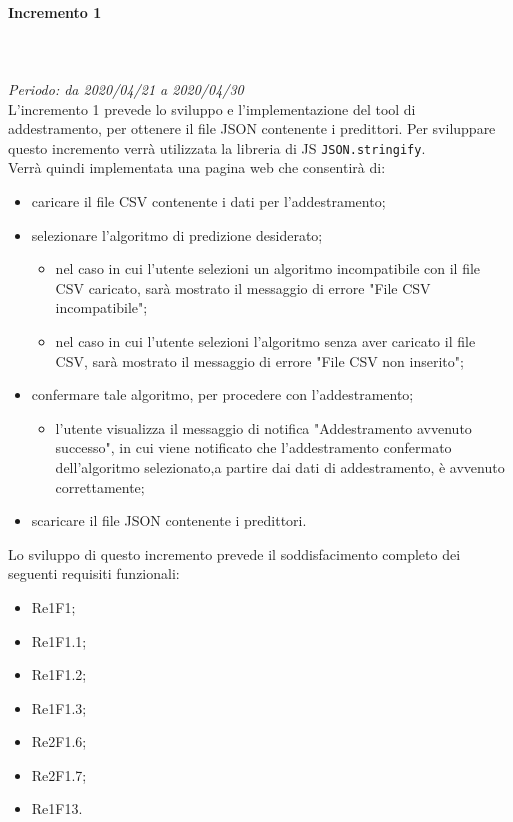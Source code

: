 \paragraph{Incremento 1}\mbox{} \\ \mbox{} \\ 
\textit{Periodo: da 2020/04/21 a 2020/04/30}\\
L’incremento 1 prevede lo sviluppo e l’implementazione del tool di addestramento, per ottenere il file JSON contenente i predittori. Per sviluppare questo incremento verrà utilizzata la libreria di JS \texttt{JSON.stringify}. \\
Verrà quindi implementata una pagina web che consentirà di: \begin{itemize}
\item caricare il file CSV contenente i dati per l'addestramento;
\item selezionare l'algoritmo di predizione desiderato;
\begin{itemize}
\item nel caso in cui l’utente selezioni un algoritmo incompatibile con il file CSV caricato, sarà mostrato il messaggio di errore "File CSV incompatibile";
\item nel caso in cui l'utente selezioni l'algoritmo senza aver caricato il file CSV, sarà mostrato il messaggio di errore "File CSV non inserito";
\end{itemize}
\item confermare tale algoritmo, per procedere con l'addestramento;
\begin{itemize}
\item l’utente visualizza il messaggio di notifica "Addestramento avvenuto successo", in cui viene notificato che l’addestramento confermato dell’algoritmo selezionato,a partire dai dati di addestramento, è avvenuto correttamente;
\end{itemize}
\item scaricare il file JSON contenente i predittori.
\end{itemize}
Lo sviluppo di questo incremento prevede il soddisfacimento completo dei seguenti requisiti funzionali:
\begin{itemize}
\item Re1F1;
\item Re1F1.1;
\item Re1F1.2;
\item Re1F1.3;
\item Re2F1.6;
\item Re2F1.7;
\item Re1F13.
\end{itemize}
